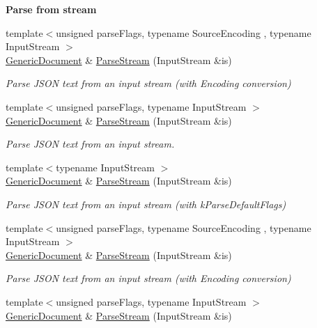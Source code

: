 \begin{Indent}\textbf{ Parse from stream}\par
\begin{DoxyCompactItemize}
\item 
{\footnotesize template$<$unsigned parse\+Flags, typename Source\+Encoding , typename Input\+Stream $>$ }\\\hyperlink{classGenericDocument}{Generic\+Document} \& \hyperlink{classGenericDocument_afe94c0abc83a20f2d7dc1ba7677e6238}{Parse\+Stream} (Input\+Stream \&is)
\begin{DoxyCompactList}\small\item\em Parse J\+S\+ON text from an input stream (with Encoding conversion) \end{DoxyCompactList}\item 
{\footnotesize template$<$unsigned parse\+Flags, typename Input\+Stream $>$ }\\\hyperlink{classGenericDocument}{Generic\+Document} \& \hyperlink{classGenericDocument_a6e154066c6f5024b91aaab25e03700e3}{Parse\+Stream} (Input\+Stream \&is)
\begin{DoxyCompactList}\small\item\em Parse J\+S\+ON text from an input stream. \end{DoxyCompactList}\item 
{\footnotesize template$<$typename Input\+Stream $>$ }\\\hyperlink{classGenericDocument}{Generic\+Document} \& \hyperlink{classGenericDocument_abe07ededbe9aaceb0058e3d254892b71}{Parse\+Stream} (Input\+Stream \&is)
\begin{DoxyCompactList}\small\item\em Parse J\+S\+ON text from an input stream (with k\+Parse\+Default\+Flags) \end{DoxyCompactList}\item 
{\footnotesize template$<$unsigned parse\+Flags, typename Source\+Encoding , typename Input\+Stream $>$ }\\\hyperlink{classGenericDocument}{Generic\+Document} \& \hyperlink{classGenericDocument_afe94c0abc83a20f2d7dc1ba7677e6238}{Parse\+Stream} (Input\+Stream \&is)
\begin{DoxyCompactList}\small\item\em Parse J\+S\+ON text from an input stream (with Encoding conversion) \end{DoxyCompactList}\item 
{\footnotesize template$<$unsigned parse\+Flags, typename Input\+Stream $>$ }\\\hyperlink{classGenericDocument}{Generic\+Document} \& \hyperlink{classGenericDocument_a6e154066c6f5024b91aaab25e03700e3}{Parse\+Stream} (Input\+Stream \&is)

\end{DoxyCompactItemize}
\end{Indent}
